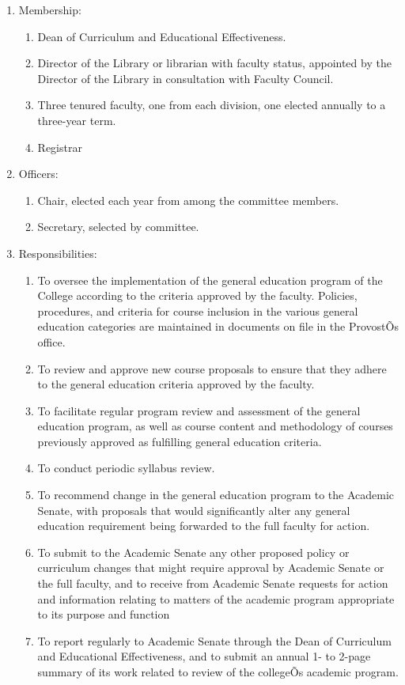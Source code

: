 \documentclass[letterpaper, 11pt]{article}
\begin{document}
					\begin{enumerate}[label=\alph*)]
						\item{Membership:
							\begin{enumerate}[label=\arabic*)]
								\item{Dean of Curriculum and Educational Effectiveness.}
								\item{Director of the Library or librarian with faculty status, appointed by the Director of the Library in consultation with Faculty Council.}
								\item{Three tenured faculty, one from each division, one elected annually to a three-year term.}
								\item{Registrar}
							\end{enumerate}
						}
						\item{Officers:
							\begin{enumerate}[label=\arabic*)]
								\item{Chair, elected each year from among the committee members.}
								\item{Secretary, selected by committee.}
							\end{enumerate}
						}
						\item{Responsibilities:
							\begin{enumerate}[label=\arabic*)]
								\item{To oversee the implementation of the general education program of the College according to the criteria approved by the faculty.  Policies, procedures, and criteria for course inclusion in the various general education categories are maintained in documents on file in the ProvostÕs office.}
								\item{To review and approve new course proposals to ensure that they adhere to the general education criteria approved by the faculty.}
								\item{To facilitate regular program review and assessment of the general education program, as well as course content and methodology of courses previously approved as fulfilling general education criteria.}
								\item{To conduct periodic syllabus review.}
								\item{To recommend change in the general education program to the Academic Senate, with proposals that would significantly alter any general education requirement being forwarded to the full faculty for action.}
								\item{To submit to the Academic Senate any other proposed policy or curriculum changes that might require approval by Academic Senate or the full faculty, and to receive from Academic Senate requests for action and information relating to matters of the academic program appropriate to its purpose and function}
								\item{To report regularly to Academic Senate through the Dean of Curriculum and Educational Effectiveness, and to submit an annual 1- to 2-page summary of its work related to review of the collegeÕs academic program.}
							\end{enumerate}
						}
					\end{enumerate}
\end{document}

